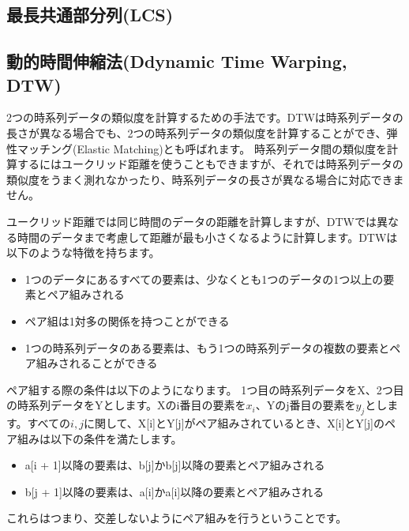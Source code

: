 \documentclass{jlreq}
\begin{document}
\subsection{最長共通部分列(LCS)}
\subsection{動的時間伸縮法(Ddynamic Time Warping, DTW)}
2つの時系列データの類似度を計算するための手法です。DTWは時系列データの長さが異なる場合でも、2つの時系列データの類似度を計算することができ、弾性マッチング(Elastic Matching)とも呼ばれます。
時系列データ間の類似度を計算するにはユークリッド距離を使うこともできますが、それでは時系列データの類似度をうまく測れなかったり、時系列データの長さが異なる場合に対応できません。

\begin{center}
\end{center}

\vspace{0.5cm}

ユークリッド距離では同じ時間のデータの距離を計算しますが、DTWでは異なる時間のデータまで考慮して距離が最も小さくなるように計算します。DTWは以下のような特徴を持ちます。

\begin{itemize}
  \item 1つのデータにあるすべての要素は、少なくとも1つのデータの1つ以上の要素とペア組みされる
  \item ペア組は1対多の関係を持つことができる
  \item 1つの時系列データのある要素は、もう1つの時系列データの複数の要素とペア組みされることができる
\end{itemize}

ペア組する際の条件は以下のようになります。
1つ目の時系列データをX、2つ目の時系列データをYとします。Xのi番目の要素を$x_i$、Yのj番目の要素を$y_j$とします。すべての$i, j$に関して、X[i]とY[j]がペア組みされているとき、X[i]とY[j]のペア組みは以下の条件を満たします。
\begin{itemize}
  \item a[i + 1]以降の要素は、b[j]かb[j]以降の要素とペア組みされる
  \item b[j + 1]以降の要素は、a[i]かa[i]以降の要素とペア組みされる
\end{itemize}

これらはつまり、交差しないようにペア組みを行うということです。
\end{document}
